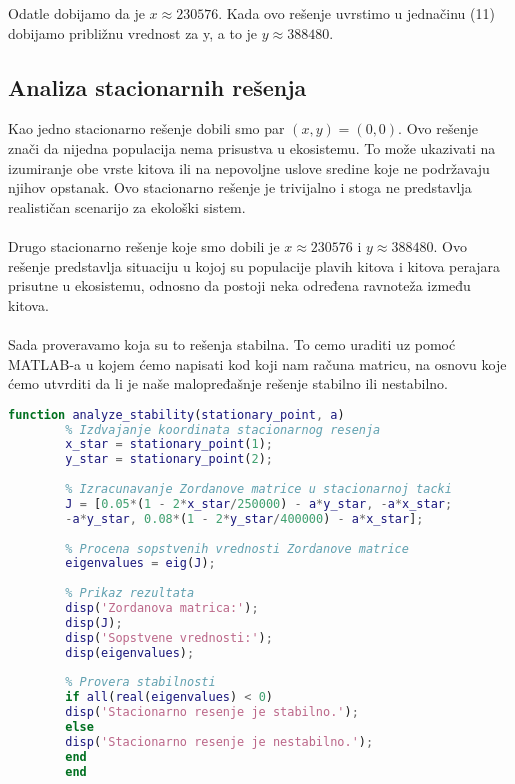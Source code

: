 \documentclass[a4paper]{article}
\begin{document}
{	Odatle dobijamo da je $ x \approx 230576 $. Kada ovo rešenje uvrstimo u jednačinu (11) dobijamo približnu vrednost za y, a to je $ y \approx 388480 $.  
	
	\subsection{Analiza stacionarnih rešenja}
	
	Kao jedno stacionarno rešenje dobili smo par $ (x, y) = (0, 0)$. Ovo rešenje znači da nijedna populacija nema prisustva u ekosistemu. To može ukazivati na izumiranje obe vrste kitova ili na nepovoljne uslove sredine koje ne podržavaju njihov opstanak. Ovo stacionarno rešenje je trivijalno i stoga ne predstavlja realističan scenarijo za ekološki sistem.\\
	\\
	Drugo stacionarno rešenje koje smo dobili je $ x \approx 230576$ i $ y \approx 388480$. Ovo rešenje predstavlja situaciju u kojoj su populacije plavih kitova i kitova perajara prisutne u ekosistemu, odnosno da postoji neka određena ravnoteža između kitova.\\
	\\
	Sada proveravamo koja su to rešenja stabilna. To cemo uraditi uz pomoć MATLAB-a u kojem ćemo napisati kod koji nam računa matricu, na osnovu koje ćemo utvrditi da li je naše malopređašnje rešenje stabilno ili nestabilno.
	
	\begin{center}
		\begin{lstlisting}[language=Matlab]
		function analyze_stability(stationary_point, a)
		% Izdvajanje koordinata stacionarnog resenja
		x_star = stationary_point(1);
		y_star = stationary_point(2);
		
		% Izracunavanje Zordanove matrice u stacionarnoj tacki
		J = [0.05*(1 - 2*x_star/250000) - a*y_star, -a*x_star;
		-a*y_star, 0.08*(1 - 2*y_star/400000) - a*x_star];
		
		% Procena sopstvenih vrednosti Zordanove matrice
		eigenvalues = eig(J);
		
		% Prikaz rezultata
		disp('Zordanova matrica:');
		disp(J);
		disp('Sopstvene vrednosti:');
		disp(eigenvalues);
		
		% Provera stabilnosti
		if all(real(eigenvalues) < 0)
		disp('Stacionarno resenje je stabilno.');
		else
		disp('Stacionarno resenje je nestabilno.');
		end
		end
		
		\end{lstlisting}
	\end{center}	
		
}
\end{document}
